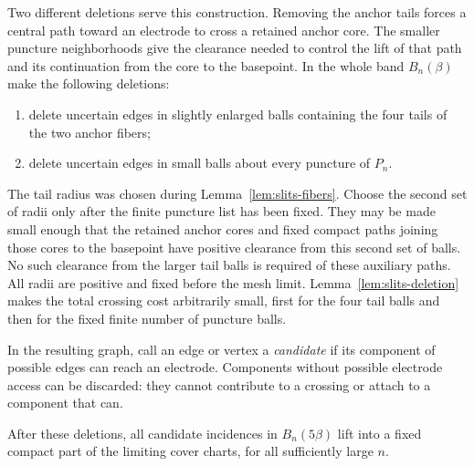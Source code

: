 Two different deletions serve this construction.  Removing the
anchor tails forces a central path toward an electrode to cross
a retained anchor core.  The smaller puncture neighborhoods give
the clearance needed to control the lift of that path and its
continuation from the core to the basepoint.  In the whole band
$B_n(\beta)$ make the following deletions:
\begin{enumerate}
\item delete uncertain edges in slightly enlarged balls containing
  the four tails of the two anchor fibers;
\item delete uncertain edges in small balls about every puncture
  of $P_n$.
\end{enumerate}
The tail radius was chosen during Lemma~\ref{lem:slits-fibers}.
Choose the second set of radii only after the finite puncture list
has been fixed.  They may be made small enough that the retained
anchor cores and fixed compact paths joining those cores to the
basepoint have positive clearance from this second set of balls.
No such clearance from the larger tail balls is required of these
auxiliary paths.  All radii are positive and fixed before the mesh
limit.  Lemma~\ref{lem:slits-deletion} makes the total crossing cost
arbitrarily small, first for the four tail balls and then for the
fixed finite number of puncture balls.

In the resulting graph, call an edge or vertex a \emph{candidate}
if its component of possible edges can reach an electrode.  Components
without possible electrode access can be discarded: they cannot
contribute to a crossing or attach to a component that can.

\begin{lemma}
\label{lem:slits-compact-candidates}
After these deletions, all candidate incidences in
$B_n(5\beta)$ lift into a fixed compact part of the limiting cover
charts, for all sufficiently large $n$.
\end{lemma}

